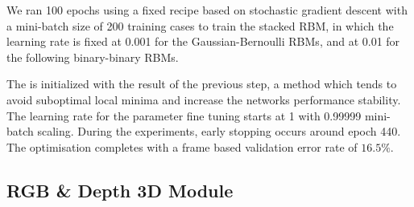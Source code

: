 We ran 100 epochs using a fixed recipe based on stochastic gradient descent with a mini-batch size of 200 training cases
to train  the stacked RBM, in which the learning rate is fixed at 0.001 for the Gaussian-Bernoulli RBMs,
and at 0.01 for the following binary-binary RBMs.






%
%
The \DBN is initialized with the result of the previous step, a method which tends to avoid suboptimal local minima and increase
the networks performance stability.
%
The learning rate for the parameter fine tuning
starts at 1 with 0.99999 mini-batch scaling. During the experiments, early stopping occurs around epoch 440.
The optimisation completes with a frame based validation error rate of $16.5\%$.%



\subsection{RGB \& Depth 3D Module} \label{sec:rgbd_modules}
